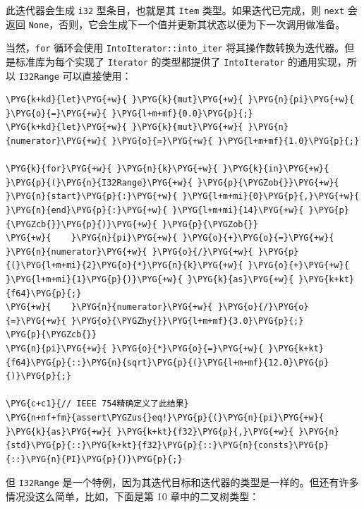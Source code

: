 此迭代器会生成 \texttt{i32} 型条目，也就是其 \texttt{Item} 类型。如果迭代已完成，则 \texttt{next} 会返回 \texttt{None}，否则，它会生成下一个值并更新其状态以便为下一次调用做准备。

当然，\texttt{for} 循环会使用 \texttt{IntoIterator::into\_iter} 将其操作数转换为迭代器。但是标准库为每个实现了 \texttt{Iterator} 的类型都提供了 \texttt{IntoIterator} 的通用实现，所以 \texttt{I32Range} 可以直接使用：

\begin{Verbatim}[commandchars=\\\{\},breaklines=true,breakanywhere=true,fontsize=\codefont,xleftmargin=17bp]
\PYG{k+kd}{let}\PYG{+w}{ }\PYG{k}{mut}\PYG{+w}{ }\PYG{n}{pi}\PYG{+w}{ }\PYG{o}{=}\PYG{+w}{ }\PYG{l+m+mf}{0.0}\PYG{p}{;}
\PYG{k+kd}{let}\PYG{+w}{ }\PYG{k}{mut}\PYG{+w}{ }\PYG{n}{numerator}\PYG{+w}{ }\PYG{o}{=}\PYG{+w}{ }\PYG{l+m+mf}{1.0}\PYG{p}{;}

\PYG{k}{for}\PYG{+w}{ }\PYG{n}{k}\PYG{+w}{ }\PYG{k}{in}\PYG{+w}{ }\PYG{p}{(}\PYG{n}{I32Range}\PYG{+w}{ }\PYG{p}{\PYGZob{}}\PYG{+w}{ }\PYG{n}{start}\PYG{p}{:}\PYG{+w}{ }\PYG{l+m+mi}{0}\PYG{p}{,}\PYG{+w}{ }\PYG{n}{end}\PYG{p}{:}\PYG{+w}{ }\PYG{l+m+mi}{14}\PYG{+w}{ }\PYG{p}{\PYGZcb{}}\PYG{p}{)}\PYG{+w}{ }\PYG{p}{\PYGZob{}}
\PYG{+w}{    }\PYG{n}{pi}\PYG{+w}{ }\PYG{o}{+}\PYG{o}{=}\PYG{+w}{ }\PYG{n}{numerator}\PYG{+w}{ }\PYG{o}{/}\PYG{+w}{ }\PYG{p}{(}\PYG{l+m+mi}{2}\PYG{o}{*}\PYG{n}{k}\PYG{+w}{ }\PYG{o}{+}\PYG{+w}{ }\PYG{l+m+mi}{1}\PYG{p}{)}\PYG{+w}{ }\PYG{k}{as}\PYG{+w}{ }\PYG{k+kt}{f64}\PYG{p}{;}
\PYG{+w}{    }\PYG{n}{numerator}\PYG{+w}{ }\PYG{o}{/}\PYG{o}{=}\PYG{+w}{ }\PYG{o}{\PYGZhy{}}\PYG{l+m+mf}{3.0}\PYG{p}{;}
\PYG{p}{\PYGZcb{}}
\PYG{n}{pi}\PYG{+w}{ }\PYG{o}{*}\PYG{o}{=}\PYG{+w}{ }\PYG{k+kt}{f64}\PYG{p}{::}\PYG{n}{sqrt}\PYG{p}{(}\PYG{l+m+mf}{12.0}\PYG{p}{)}\PYG{p}{;}

\PYG{c+c1}{// IEEE 754精确定义了此结果}
\PYG{n+nf+fm}{assert\PYGZus{}eq!}\PYG{p}{(}\PYG{n}{pi}\PYG{+w}{ }\PYG{k}{as}\PYG{+w}{ }\PYG{k+kt}{f32}\PYG{p}{,}\PYG{+w}{ }\PYG{n}{std}\PYG{p}{::}\PYG{k+kt}{f32}\PYG{p}{::}\PYG{n}{consts}\PYG{p}{::}\PYG{n}{PI}\PYG{p}{)}\PYG{p}{;}
\end{Verbatim}

但 \texttt{I32Range} 是一个特例，因为其迭代目标和迭代器的类型是一样的。但还有许多情况没这么简单，比如，下面是第 10 章中的二叉树类型：

